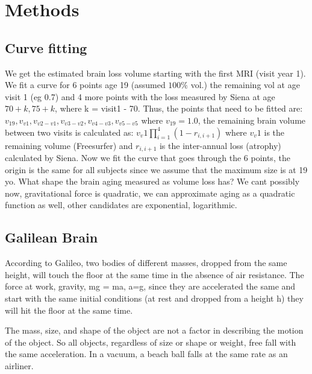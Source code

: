 \documentclass[twoside,onecolumn]{article}
\begin{document}



\section{Methods}
\subsection{Curve fitting}
We get the estimated brain loss volume starting with the first MRI (visit year 1). We fit a curve for 6 points age 19 (assumed $100\%$ vol.) the remaining vol at age visit 1 (eg 0.7) and 4 more points with the loss measured by Siena at age $70+ k, 75+k$, where k = visit1 - 70. Thus, the points that need to be fitted are: 
$v_19, v_{v1}, v_{v2-v1},v_{v3-v2},v_{v4-v3},v_{v5-v5}$ where $v_19 = 1.0$, the remaining brain volume between two visits is calculated as:
$v_v1 \prod_{i=1}^{4}(1-r_{i,i+1})$ where $v_v1$ is the remaining volume (Freesurfer) and $r_{i,i+1}$ is the inter-annual loss (atrophy) calculated by Siena.
Now we fit the curve that goes through the 6 points, the origin is the same for all subjects since we assume that the maximum size is at 19 yo. 
What shape the brain aging measured as volume loss has? We cant possibly now, gravitational force is quadratic, we can approximate aging as a quadratic function as well, other candidates are exponential, logarithmic.



\subsection{Galilean Brain}
According to Galileo, two bodies of different masses, dropped from the same height, will touch the floor at the same time in the absence of air resistance.
The force at work, gravity, mg = ma, a=g,  since they are accelerated the same and start with the same initial conditions (at rest and dropped from a height h) they will hit the floor at the same time.

The mass, size, and shape of the object are not a factor in describing the motion of the object. So all objects, regardless of size or shape or weight, free fall with the same acceleration. In a vacuum, a beach ball falls at the same rate as an airliner. 
\end{document}
